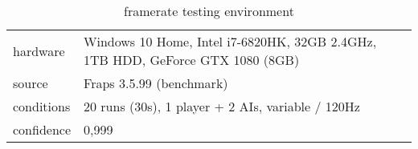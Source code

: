 \begin{table}[!ht]
	\centering
    \begin{tabular}{l|l}
        hardware & Windows 10 Home, Intel i7-6820HK, 32GB 2.4GHz, 1TB HDD, GeForce GTX 1080 (8GB) \\
		source & Fraps 3.5.99 (benchmark) \\
		conditions & 20 runs (30s), 1 player + 2 AIs, variable / 120Hz \\
		confidence & 0,999 \\
    \end{tabular}

    \caption{framerate testing environment}\label{tb:performance:framerate}
\end{table}

